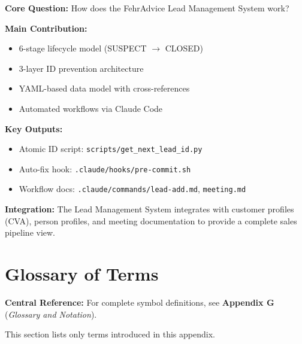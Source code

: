 \begin{tcolorbox}[colback=green!10!white, colframe=green!75!black,
    title=\textbf{Appendix UNMAPPED_BN: Summary}]

\textbf{Core Question:} How does the FehrAdvice Lead Management System work?

\textbf{Main Contribution:}
\begin{itemize}[nosep]
    \item 6-stage lifecycle model (SUSPECT $\to$ CLOSED)
    \item 3-layer ID prevention architecture
    \item YAML-based data model with cross-references
    \item Automated workflows via Claude Code
\end{itemize}

\textbf{Key Outputs:}
\begin{itemize}[nosep]
    \item Atomic ID script: \texttt{scripts/get\_next\_lead\_id.py}
    \item Auto-fix hook: \texttt{.claude/hooks/pre-commit.sh}
    \item Workflow docs: \texttt{.claude/commands/lead-add.md}, \texttt{meeting.md}
\end{itemize}

\textbf{Integration:} The Lead Management System integrates with customer profiles (CVA), person profiles, and meeting documentation to provide a complete sales pipeline view.

\end{tcolorbox}


\section{Glossary of Terms}
\label{sec:bn-glossary}

\begin{tcolorbox}[colback=blue!5!white, colframe=blue!75!black]
\textbf{Central Reference:} For complete symbol definitions, see
\textbf{Appendix G} (\textit{Glossary and Notation}).

This section lists only terms introduced in this appendix.
\end{tcolorbox}

\vspace{0.5em}

